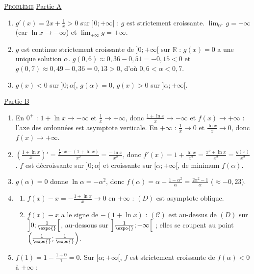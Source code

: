 \begin{corrige}
\noindent \underline{\textsc{Probl\`eme}} \newline
\underline{Partie A}
\begin{enumerate}
\item $g'(x) = 2x + \frac{1}{x} > 0$ sur $]0 ; +\infty[$ : $g$ est strictement croissante. $\lim_{0^+} g = -\infty$
      (car $\ln x \to -\infty$) et $\lim_{+\infty} g = +\infty$.
\item $g$ est continue strictement croissante de $]0;+\infty[$ sur $\mathbb{R}$ : $g(x) = 0$ a une unique solution $\alpha$.
      $g(0{,}6) \approx 0{,}36 - 0{,}51 = -0{,}15 < 0$ et $g(0{,}7) \approx 0{,}49 - 0{,}36 = 0{,}13 > 0$, d'o\`u $0{,}6 < \alpha < 0{,}7$.
\item $g(x) < 0$ sur $]0 ; \alpha[$, $g(\alpha) = 0$, $g(x) > 0$ sur $]\alpha ; +\infty[$.
\end{enumerate}
\underline{Partie B}
\begin{enumerate}
\item En $0^+$ : $1 + \ln x \to -\infty$ et $\frac{1}{x} \to +\infty$, donc $\frac{1 + \ln x}{x} \to -\infty$ et $f(x) \to +\infty$ :
      l'axe des ordonn\'ees est asymptote verticale. En $+\infty$ : $\frac{1}{x} \to 0$ et $\frac{\ln x}{x} \to 0$, donc $f(x) \to +\infty$.
\item $\left(\frac{1 + \ln x}{x}\right)' = \frac{\frac{1}{x}\cdot x - (1 + \ln x)}{x^2} = \frac{-\ln x}{x^2}$, donc
      $f'(x) = 1 + \frac{\ln x}{x^2} = \frac{x^2 + \ln x}{x^2} = \frac{g(x)}{x^2}$.
      $f$ est d\'ecroissante sur $]0 ; \alpha]$ et croissante sur $[\alpha ; +\infty[$, de minimum $f(\alpha)$.
\item $g(\alpha) = 0$ donne $\ln\alpha = -\alpha^2$, donc $f(\alpha) = \alpha - \frac{1 - \alpha^2}{\alpha} = \frac{2\alpha^2 - 1}{\alpha}$
      ($\approx -0{,}23$).
\item \begin{enumerate}
      \item $f(x) - x = -\frac{1 + \ln x}{x} \to 0$ en $+\infty$ : $(D)$ est asymptote oblique.
      \item $f(x) - x$ a le signe de $-(1 + \ln x)$ : $(\mathscr{C})$ est au-dessus de $(D)$ sur $\left]0 ; \frac{1}{\expo{}}\right[$,
            au-dessous sur $\left]\frac{1}{\expo{}} ; +\infty\right[$ ; elles se coupent au point $\left(\frac{1}{\expo{}} ; \frac{1}{\expo{}}\right)$.
      \end{enumerate}
\item $f(1) = 1 - \frac{1 + 0}{1} = 0$. Sur $[\alpha ; +\infty[$, $f$ est strictement croissante de $f(\alpha) < 0$ \`a $+\infty$ :

\end{enumerate}
\end{corrige}
